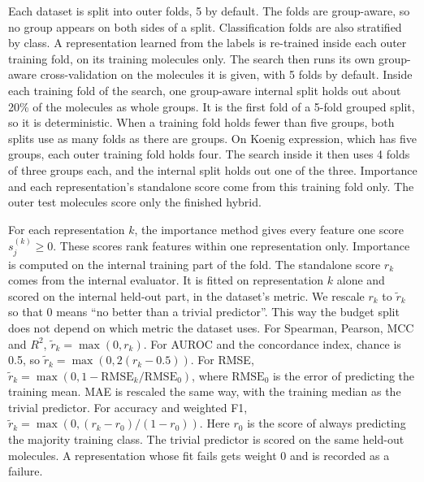 Each dataset is split into outer folds, 5 by default. The folds are group-aware, so no group appears on both sides of a split. Classification folds are also stratified by class. A representation learned from the labels is re-trained inside each outer training fold, on its training molecules only. The search then runs its own group-aware cross-validation on the molecules it is given, with 5 folds by default. Inside each training fold of the search, one group-aware internal split holds out about 20\% of the molecules as whole groups. It is the first fold of a 5-fold grouped split, so it is deterministic. When a training fold holds fewer than five groups, both splits use as many folds as there are groups. On Koenig expression, which has five groups, each outer training fold holds four. The search inside it then uses 4 folds of three groups each, and the internal split holds out one of the three. Importance and each representation's standalone score come from this training fold only. The outer test molecules score only the finished hybrid.

For each representation $k$, the importance method gives every feature one score $s^{(k)}_j \ge 0$. These scores rank features within one representation only. Importance is computed on the internal training part of the fold. The standalone score $r_k$ comes from the internal evaluator. It is fitted on representation $k$ alone and scored on the internal held-out part, in the dataset's metric. We rescale $r_k$ to $\tilde r_k$ so that 0 means ``no better than a trivial predictor''. This way the budget split does not depend on which metric the dataset uses. For Spearman, Pearson, MCC and $R^2$, $\tilde r_k = \max(0, r_k)$. For AUROC and the concordance index, chance is 0.5, so $\tilde r_k = \max(0, 2(r_k - 0.5))$. For RMSE, $\tilde r_k = \max(0, 1 - \mathrm{RMSE}_k/\mathrm{RMSE}_0)$, where $\mathrm{RMSE}_0$ is the error of predicting the training mean. MAE is rescaled the same way, with the training median as the trivial predictor. For accuracy and weighted F1, $\tilde r_k = \max(0, (r_k - r_0)/(1 - r_0))$. Here $r_0$ is the score of always predicting the majority training class. The trivial predictor is scored on the same held-out molecules. A representation whose fit fails gets weight 0 and is recorded as a failure.

